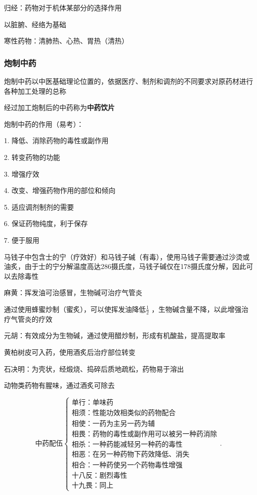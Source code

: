 \begin{defi}
    归经：药物对于机体某部分的选择作用

    以脏腑、经络为基础
\end{defi}
寒性药物：清肺热、心热、胃热（清热）
\subsubsection*{炮制中药}%
\label{subsub:炮制中药}
炮制中药以中医基础理论位置的，依据医疗、制剂和调剂的不同要求对原药材进行各种加工处理的总称

经过加工炮制后的中药称为\textbf{中药饮片}

\begin{notation}
    炮制中药的作用（易考）：

    1. 降低、消除药物的毒性或副作用

    2. 转变药物的功能

    3. 增强疗效

    4. 改变、增强药物作用的部位和倾向

    5. 适应调剂制剂的需要

    6. 保证药物纯度，利于保存

    7. 便于服用
\end{notation}
\begin{eg}
    马钱子中包含士的宁（疗效好）和马钱子碱（有毒），使用马钱子需要通过沙烫或油炙，由于士的宁分解温度高达286摄氏度，马钱子碱仅在178摄氏度分解，因此可以去除毒性
\end{eg}
\begin{eg}
    麻黄：挥发油可治感冒，生物碱可治疗气管炎

    通过使用蜂蜜炒制（蜜炙），可以使挥发油降低$\frac{1}{2}$ ，生物碱含量不降，以此增强治疗气管炎的疗效
\end{eg}
\begin{eg}
    元胡：有效成分为生物碱，通过使用醋炒制，形成有机酸盐，提高提取率
\end{eg}
\begin{eg}
    黄柏树皮可入药，使用酒炙后治疗部位转变
\end{eg}
\begin{eg}
    石决明：为壳状，经煅烧、捣碎后质地疏松，药物易于溶出
\end{eg}
\begin{eg}
    动物类药物有腥味，通过酒炙可除去
\end{eg}
\[
    \mbox{中药配伍}
    \begin{cases}
        \mbox{单行：单味药}\\ 
        \mbox{相须：性能功效相类似的药物配合}\\ 
        \mbox{相使：一药为主另一药为辅}\\
        \mbox{相畏：药物的毒性或副作用可以被另一种药消除}\\ 
        \mbox{相杀：一种药能减轻另一种药的毒性}\\ 
        \mbox{相恶：在另一种药物下药效降低、消失}\\ 
        \mbox{相合：一种药使另一个药物毒性增强}\\
        \mbox{十八反：剧烈毒性}\\ 
        \mbox{十九畏：同上}
    \end{cases}
.\] 
